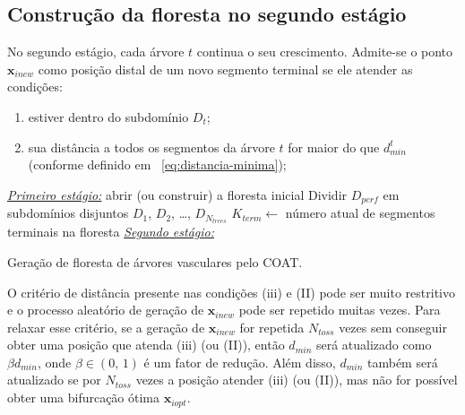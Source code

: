 \subsection{Construção da floresta no segundo estágio}\label{subsec:construcao-da-floresta-segundo-estagio}

No segundo estágio, cada árvore $t$ continua o seu crescimento. Admite-se o 
ponto $\mathbf{x}_{inew}$ como posição distal de um novo segmento terminal
se ele atender as condições:
\begin{enumerate}[label=(\Roman*)]
 \item estiver dentro do subdomínio $D_t$;
 \item sua distância a todos os segmentos da árvore $t$ for maior do que 
 $d_{min}^t$ (conforme definido em ~\eqref{eq:distancia-minima});
\end{enumerate}

\begin{algorithm}

  \textit{\underline{Primeiro estágio:}} abrir (ou construir) a floresta inicial\;
  Dividir $D_{perf}$ em subdomínios disjuntos $D_1$, $D_2$, \ldots, $D_{N_{trees}}$\;
  $K_{term}\leftarrow$ número atual de segmentos terminais na floresta\;
  \textit{\underline{Segundo estágio:}}
\caption{Gera\c{c}ão de floresta de árvores vasculares pelo COAT.}
\label{algo:COAT}
\end{algorithm}

O critério de distância presente nas 
condições (iii) e (II) pode ser muito restritivo e o processo aleatório de geração de 
$\mathbf{x}_{inew}$ pode ser repetido muitas vezes. Para relaxar esse critério, 
se a geração de $\mathbf{x}_{inew}$ for repetida $N_{toss}$ vezes sem conseguir 
obter uma posição que atenda (iii) (ou (II)), então $d_{min}$ será atualizado como 
$\beta d_{min}$, onde $\beta\in (0,\,1)$ é um fator de redução. Além disso, 
$d_{min}$ também será atualizado se por $N_{toss}$ vezes a posição atender 
(iii) (ou (II)), mas não for possível obter uma bifurcação ótima $\mathbf{x}_{iopt}$.
